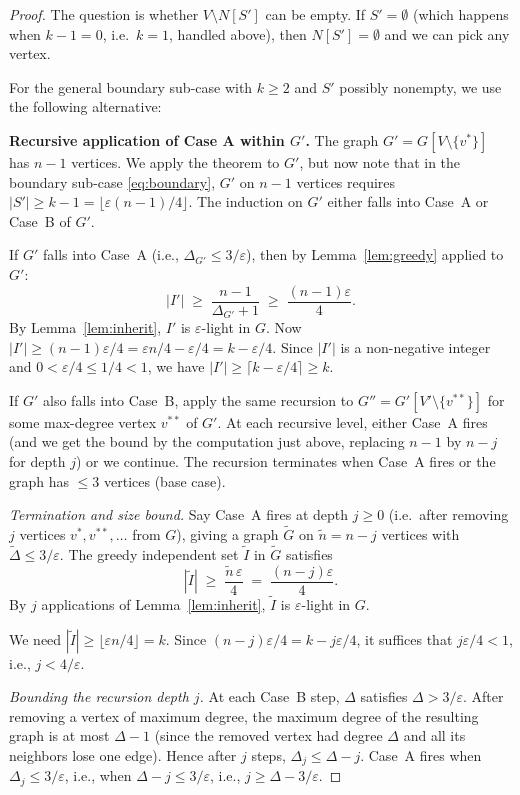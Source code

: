 \documentclass[12pt]{article}
\theoremstyle{definition}
\begin{document}
\begin{proof}
The question is whether $V\setminus N[S']$ can be empty.  If $S'=\emptyset$
(which happens when $k-1=0$, i.e.\ $k=1$, handled above), then $N[S']=\emptyset$
and we can pick any vertex.

\medskip
For the general boundary sub-case with $k\ge 2$ and $S'$ possibly nonempty,
we use the following alternative:

\medskip\noindent\textbf{Recursive application of Case A within $G'$.}
The graph $G'=G[V\setminus\{v^*\}]$ has $n-1$ vertices.  We apply the theorem
to $G'$, but now note that in the boundary sub-case \eqref{eq:boundary},
$G'$ on $n-1$ vertices requires $|S'|\ge k-1=\lfloor\varepsilon(n-1)/4\rfloor$.
The induction on $G'$ either falls into Case~A or Case~B of $G'$.

If $G'$ falls into Case~A (i.e., $\Delta_{G'}\le 3/\varepsilon$), then by
Lemma~\ref{lem:greedy} applied to $G'$:
\[
   |I'| \;\ge\; \frac{n-1}{\Delta_{G'}+1} \;\ge\; \frac{(n-1)\varepsilon}{4}.
\]
By Lemma~\ref{lem:inherit}, $I'$ is $\varepsilon$-light in $G$.
Now $|I'|\ge(n-1)\varepsilon/4 = \varepsilon n/4 - \varepsilon/4 = k - \varepsilon/4$.
Since $|I'|$ is a non-negative integer and $0<\varepsilon/4\le 1/4<1$,
we have $|I'|\ge\lceil k-\varepsilon/4\rceil\ge k$.  \checkmark

If $G'$ also falls into Case~B, apply the same recursion to $G''=G'[V'\setminus\{v^{**}\}]$
for some max-degree vertex $v^{**}$ of $G'$.  At each recursive level, either
Case~A fires (and we get the bound by the computation just above, replacing
$n-1$ by $n-j$ for depth $j$) or we continue.  The recursion terminates
when Case~A fires or the graph has $\le 3$ vertices (base case).

\medskip
\noindent\textit{Termination and size bound.}
Say Case~A fires at depth $j\ge 0$ (i.e.\ after removing $j$ vertices
$v^*,v^{**},\dots$ from $G$), giving a graph $\tilde G$ on $\tilde n=n-j$
vertices with $\tilde\Delta\le 3/\varepsilon$.  The greedy independent set $\tilde I$
in $\tilde G$ satisfies
\[
   |\tilde I| \;\ge\; \frac{\tilde n\,\varepsilon}{4} \;=\; \frac{(n-j)\varepsilon}{4}.
\]
By $j$ applications of Lemma~\ref{lem:inherit}, $\tilde I$ is $\varepsilon$-light in $G$.

We need $|\tilde I|\ge\lfloor\varepsilon n/4\rfloor=k$.  Since
$(n-j)\varepsilon/4 = k - j\varepsilon/4$, it suffices that $j\varepsilon/4 < 1$, i.e., $j<4/\varepsilon$.

\medskip\noindent\textit{Bounding the recursion depth $j$.}
At each Case~B step, $\Delta$ satisfies $\Delta>3/\varepsilon$.  After removing a
vertex of maximum degree, the maximum degree of the resulting graph is at most
$\Delta-1$ (since the removed vertex had degree $\Delta$ and all its neighbors
lose one edge).  Hence after $j$ steps, $\Delta_j\le\Delta - j$.  Case~A fires
when $\Delta_j\le 3/\varepsilon$, i.e., when $\Delta - j\le 3/\varepsilon$, i.e., $j\ge\Delta-3/\varepsilon$.


\end{proof}
\end{document}
